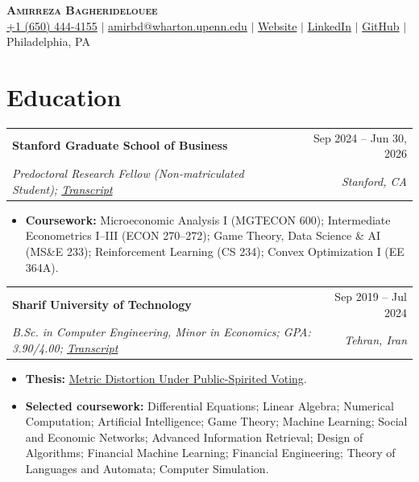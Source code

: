\documentclass[letterpaper,11pt]{article}
\makeatletter
\newcommand{\entry}[4]{
  \par\addvspace{4pt}
  \begin{tabularx}{\textwidth}{@{}Xr@{}}
    \normalsize\textbf{#1} & \normalsize #2 \\[1pt]
    \textit{\small #3} & \textit{\small #4}
  \end{tabularx}\par\vspace{-3pt}
}
\newenvironment{cvitems}[1][3pt]
  {\small\begin{itemize}[leftmargin=0.55cm, itemsep=3pt, parsep=0pt, topsep=#1]}
  {\end{itemize}\vspace{-5pt}}
\newcommand{\link}[2]{\href{#1}{\textcolor{cvblue}{#2}}}
\makeatother
\begin{document}
\enlargethispage{14pt}

\begin{center}
  {\Huge\scshape\textbf{Amirreza Bagheridelouee}}\\[5pt]
  \small
  \faMobile\hspace{0.5pt} \href{tel:+16504444155}{+1 (650) 444-4155}
   $|$
  \faAt\hspace{0.5pt} \href{mailto:amirbd@wharton.upenn.edu}{amirbd@wharton.upenn.edu}
   $|$
  \faGlobe\hspace{0.5pt} \link{https://ambadal.github.io/}{Website}
   $|$
  \faLinkedinSquare\hspace{0.5pt} \link{https://www.linkedin.com/in/amirreza-bagheridelouee-265557146}{LinkedIn}
   $|$
  \faGithub\hspace{0.5pt} \link{https://github.com/AmBadAl}{GitHub}
   $|$
  \faMapMarker\hspace{0.5pt} Philadelphia, PA
\end{center}
\vspace{-16pt}

\section{Education}
\begingroup
{}

\entry
  {Stanford Graduate School of Business}{Sep 2024 -- Jun 30, 2026}
  {Predoctoral Research Fellow (Non-matriculated Student); \link{https://drive.google.com/file/d/1kb_k2UNL9kZQXFPfv0aMRYIPIigM8STo/view?usp=sharing}{Transcript}}
  {Stanford, CA}
\begin{cvitems}[4pt]
  \item \textbf{Coursework:} Microeconomic Analysis I (MGTECON 600); Intermediate Econometrics I--III (ECON 270--272); Game Theory, Data Science \& AI (MS\&E 233); Reinforcement Learning (CS 234); Convex Optimization I (EE 364A).
\end{cvitems}

\entry
  {Sharif University of Technology}{Sep 2019 -- Jul 2024}
  {B.Sc. in Computer Engineering, Minor in Economics; GPA: 3.90/4.00; \link{https://drive.google.com/file/d/1WJSjQwN7rH9XDqTEst-5WVKbvuHeijN_/view?usp=sharing}{Transcript}}
  {Tehran, Iran}
\begin{cvitems}[4pt]
  \item \textbf{Thesis:} \link{https://drive.google.com/file/d/1PQK5nqoHnSbwBZNsM1jnAdzhP37o13iG/view?usp=sharing}{Metric Distortion Under Public-Spirited Voting}.
  \item \textbf{Selected coursework:} Differential Equations; Linear Algebra; Numerical Computation; Artificial Intelligence; Game Theory; Machine Learning; Social and Economic Networks; Advanced Information Retrieval; Design of Algorithms; Financial Machine Learning; Financial Engineering; Theory of Languages and Automata; Computer Simulation.
\end{cvitems}
\end{document}
